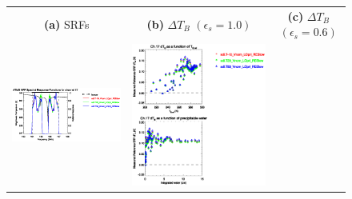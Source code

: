 \begin{figure}[H]
  \centering
  \begin{tabular}{c c c}
    \textsf{\textbf{(a)} SRFs} &
    \textsf{\textbf{(b)} $\Delta T_B$ $(\epsilon_s = 1.0)$} &
    \textsf{\textbf{(c)} $\Delta T_B$ $(\epsilon_s = 0.6)$} \\
    \includegraphics[bb=80 400 280 558,clip,scale=0.85]{graphics/srf/Tset/atms_npp.ch17.osrf.eps} &
    \includegraphics[bb=85 400 260 558,clip,scale=0.85]{graphics/dtb/Tset/e1.0_r0.0/atms_npp.ch17.dTb.eps} & 

\end{tabular}
\end{figure}

